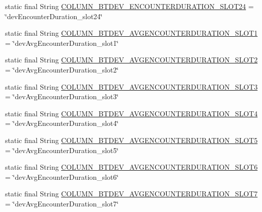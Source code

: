 \begin{DoxyCompactItemize}
\item 
static final String \hyperlink{classcs_1_1usense_1_1db_1_1_usense_s_q_lite_helper_ab97242236562a2a3cc3c8fcf5b2a9327}{C\+O\+L\+U\+M\+N\+\_\+\+B\+T\+D\+E\+V\+\_\+\+E\+N\+C\+O\+U\+N\+T\+E\+R\+D\+U\+R\+A\+T\+I\+O\+N\+\_\+\+S\+L\+O\+T24} = \char`\"{}dev\+Encounter\+Duration\+\_\+slot24\char`\"{}
\item 
static final String \hyperlink{classcs_1_1usense_1_1db_1_1_usense_s_q_lite_helper_a4364bf9bf47594b9f0a42057c943b105}{C\+O\+L\+U\+M\+N\+\_\+\+B\+T\+D\+E\+V\+\_\+\+A\+V\+G\+E\+N\+C\+O\+U\+N\+T\+E\+R\+D\+U\+R\+A\+T\+I\+O\+N\+\_\+\+S\+L\+O\+T1} = \char`\"{}dev\+Avg\+Encounter\+Duration\+\_\+slot1\char`\"{}
\item 
static final String \hyperlink{classcs_1_1usense_1_1db_1_1_usense_s_q_lite_helper_a80262668354d8645154ea5a14e04c52f}{C\+O\+L\+U\+M\+N\+\_\+\+B\+T\+D\+E\+V\+\_\+\+A\+V\+G\+E\+N\+C\+O\+U\+N\+T\+E\+R\+D\+U\+R\+A\+T\+I\+O\+N\+\_\+\+S\+L\+O\+T2} = \char`\"{}dev\+Avg\+Encounter\+Duration\+\_\+slot2\char`\"{}
\item 
static final String \hyperlink{classcs_1_1usense_1_1db_1_1_usense_s_q_lite_helper_a04317635a4f9a3bcae28f454557e5121}{C\+O\+L\+U\+M\+N\+\_\+\+B\+T\+D\+E\+V\+\_\+\+A\+V\+G\+E\+N\+C\+O\+U\+N\+T\+E\+R\+D\+U\+R\+A\+T\+I\+O\+N\+\_\+\+S\+L\+O\+T3} = \char`\"{}dev\+Avg\+Encounter\+Duration\+\_\+slot3\char`\"{}
\item 
static final String \hyperlink{classcs_1_1usense_1_1db_1_1_usense_s_q_lite_helper_a62bb3995d5ea401d6f3fa03bc0789690}{C\+O\+L\+U\+M\+N\+\_\+\+B\+T\+D\+E\+V\+\_\+\+A\+V\+G\+E\+N\+C\+O\+U\+N\+T\+E\+R\+D\+U\+R\+A\+T\+I\+O\+N\+\_\+\+S\+L\+O\+T4} = \char`\"{}dev\+Avg\+Encounter\+Duration\+\_\+slot4\char`\"{}
\item 
static final String \hyperlink{classcs_1_1usense_1_1db_1_1_usense_s_q_lite_helper_a1a3fe6f437cdb24f4b11948863edc32f}{C\+O\+L\+U\+M\+N\+\_\+\+B\+T\+D\+E\+V\+\_\+\+A\+V\+G\+E\+N\+C\+O\+U\+N\+T\+E\+R\+D\+U\+R\+A\+T\+I\+O\+N\+\_\+\+S\+L\+O\+T5} = \char`\"{}dev\+Avg\+Encounter\+Duration\+\_\+slot5\char`\"{}
\item 
static final String \hyperlink{classcs_1_1usense_1_1db_1_1_usense_s_q_lite_helper_a7fd44ab8fdf8bd1a2f1e873c264a4745}{C\+O\+L\+U\+M\+N\+\_\+\+B\+T\+D\+E\+V\+\_\+\+A\+V\+G\+E\+N\+C\+O\+U\+N\+T\+E\+R\+D\+U\+R\+A\+T\+I\+O\+N\+\_\+\+S\+L\+O\+T6} = \char`\"{}dev\+Avg\+Encounter\+Duration\+\_\+slot6\char`\"{}
\item 
static final String \hyperlink{classcs_1_1usense_1_1db_1_1_usense_s_q_lite_helper_aea9d176131b332672a82e58411670c9a}{C\+O\+L\+U\+M\+N\+\_\+\+B\+T\+D\+E\+V\+\_\+\+A\+V\+G\+E\+N\+C\+O\+U\+N\+T\+E\+R\+D\+U\+R\+A\+T\+I\+O\+N\+\_\+\+S\+L\+O\+T7} = \char`\"{}dev\+Avg\+Encounter\+Duration\+\_\+slot7\char`\"{}

\end{DoxyCompactItemize}
